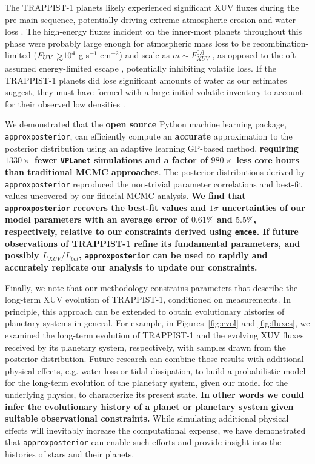 \documentclass[twocolumn]{aastex62}
\def\gsim{~\rlap{$>$}{\lower 1.0ex\hbox{$\sim$}}}
\newcommand{\xxx}[1]{{\textbf{#1}}}
\newcommand{\vplanet}[0]{\texttt{VPLanet}\xspace}
\newcommand{\emcee}[0]{\texttt{emcee}\xspace}
\newcommand{\approxposterior}[0]{\texttt{approxposterior}\xspace}
\begin{document}
The TRAPPIST-1 planets likely experienced significant XUV fluxes during the pre-main sequence, potentially driving extreme atmospheric erosion and water loss \citep{Bolmont2017,Bourrier2017a}. The high-energy fluxes incident on the inner-most planets throughout this phase were probably large enough for atmospheric mass loss to be recombination-limited ($F_{UV} \gsim 10^4$ g s$^{-1}$ cm$^{-2}$) and scale as $\dot{m} \sim F_{XUV}^{0.6}$ \citep{MurrayClay2009}, as opposed to the oft-assumed energy-limited escape \citep[$\dot{m} \sim F_{XUV}$,][]{Watson1981,Lammer2003}, potentially inhibiting volatile loss. If the TRAPPIST-1 planets did lose significant amounts of water as our estimates suggest, they must have formed with a large initial volatile inventory to account for their observed low densities \citep{Grimm2018}.

We demonstrated that the \xxx{open source} Python machine learning package, \approxposterior \citep{FlemingVanderPlas2018}, can efficiently compute an \xxx{accurate} approximation to the posterior distribution using an adaptive learning GP-based method, \xxx{requiring $1330\times$ fewer \vplanet simulations and a factor of $980\times$ less core hours than traditional MCMC approaches}. The posterior distributions derived by \approxposterior reproduced the non-trivial parameter correlations and best-fit values uncovered by our fiducial MCMC analysis. \xxx{We find that \approxposterior recovers the best-fit values and $1\sigma$ uncertainties of our model parameters with an average error of $0.61\%$ and $5.5\%$, respectively, relative to our constraints derived using \emcee. If future observations of TRAPPIST-1 refine its fundamental parameters, and possibly $L_{XUV}/L_{bol}$, \approxposterior can be used to rapidly and accurately replicate our analysis to update our constraints.}  

Finally, we note that our methodology constrains parameters that describe the long-term XUV evolution of TRAPPIST-1, conditioned on measurements. In principle, this approach can be extended to obtain evolutionary histories of planetary systems in general.  For example, in Figures~\ref{fig:evol} and \ref{fig:fluxes}, we examined the long-term evolution of TRAPPIST-1 and the evolving XUV fluxes received by its planetary system, respectively, with samples drawn from the posterior distribution. Future research can combine those results with additional physical effects, e.g. water loss or tidal dissipation, to build a probabilistic model for the long-term evolution of the planetary system, given our model for the underlying physics, to characterize its present state. \xxx{In other words we could infer the evolutionary history of a planet or planetary system given suitable observational constraints.} While simulating additional physical effects will inevitably increase the computational expense, we have demonstrated that \approxposterior can enable such efforts and provide insight into the histories of stars and their planets.
\end{document}
